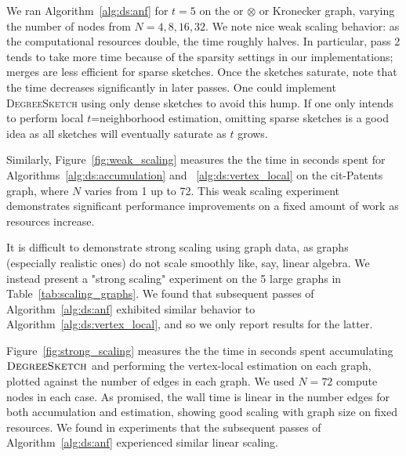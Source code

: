 \documentclass{vldb}
\newcommand{\algoname}[1]{\textnormal{\textsc{#1}}}
\begin{document}

We ran Algorithm~\ref{alg:ds:anf} for $t=5$ on the or $\otimes$ or Kronecker graph, varying the number of nodes from $N= 4, 8, 16, 32$. 
We note nice weak scaling behavior: as the computational resources double, the time roughly halves. 
In particular, pass 2 tends to take more time because of the sparsity settings in our implementations; merges are less efficient for sparse sketches. 
Once the sketches saturate, note that the time decreases significantly in later passes.
One could implement \algoname{DegreeSketch} using only dense sketches to avoid this hump.
If one only intends to perform local $t$=neighborhood estimation, omitting sparse sketches is a good idea as all sketches will eventually saturate as $t$ grows.

Similarly, Figure~\ref{fig:weak_scaling} measures the the time in seconds spent for Algorithms~\ref{alg:ds:accumulation} and ~\ref{alg:ds:vertex_local}  on the cit-Patents graph, where $N$ varies from 1 up to 72. 
This weak scaling experiment demonstrates significant performance improvements on a fixed amount of work as resources increase.

It is difficult to demonstrate strong scaling using graph data, as graphs (especially realistic ones) do not scale smoothly like, say, linear algebra.
We instead present a "strong scaling" experiment on the 5 large graphs in Table~\ref{tab:scaling_graphs}.
We found that subsequent passes of Algorithm~\ref{alg:ds:anf} exhibited similar behavior to Algorithm~\ref{alg:ds:vertex_local}, and so we only report results for the latter.

Figure~\ref{fig:strong_scaling} measures the the time in seconds spent accumulating $\algoname{DegreeSketch}$ and performing the vertex-local estimation on each graph, plotted against the number of edges in each graph. 
We used $N=72$ compute nodes in each case. 
As promised, the wall time is linear in the number edges for both accumulation and estimation, showing good scaling with graph size on fixed resources.
We found in experiments that the subsequent passes of Algorithm~\ref{alg:ds:anf} experienced similar linear scaling.
\end{document}
